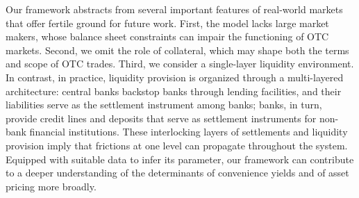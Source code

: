 \documentclass[12pt,american,english,notitlepage]{article}
\begin{document}
Our framework abstracts from several important features of real-world markets that offer fertile ground for future work. First, the model lacks large market makers, whose balance sheet constraints can impair the functioning of OTC markets. Second, we omit the role of collateral, which may shape both the terms and scope of OTC trades. Third, we consider a single-layer liquidity environment. In contrast, in practice, liquidity provision is organized through a multi-layered architecture: central banks backstop banks through lending facilities, and their liabilities serve as the settlement instrument among banks; banks, in turn, provide credit lines and deposits that serve as settlement instruments for non-bank financial institutions. These interlocking layers of settlements and liquidity provision imply that frictions at one level can propagate throughout the system. Equipped with suitable data to infer its parameter, our framework can contribute to a deeper understanding of the determinants of convenience yields and of asset pricing more broadly.

\newpage{}


\let\OLDthebibliography\thebibliography
\renewcommand\thebibliography[1]{
  \OLDthebibliography{#1}
  \setlength{\parskip}{0.5pt}
  \setlength{\itemsep}{0pt plus 0.3ex}
}


\newpage{}

\thispagestyle{empty}
\appendix


\setcounter{page}{1}

\renewcommand{\thepage}{A\arabic{page}}



\clearpage

\appendixtoc        %
\startappendixtoc   %

\newpage{}



% 
\end{document}
